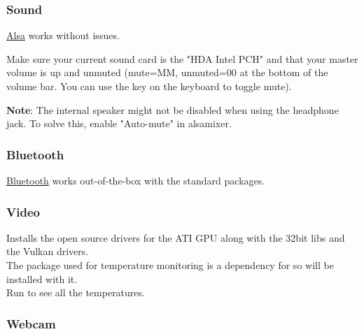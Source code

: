 \subsubsection{Sound}

\href{https://wiki.archlinux.org/index.php/ALSA}{Alsa} works without issues.

\begin{blocksection}
    Make sure your current sound card is the "HDA Intel PCH" and that your master volume is up and unmuted (mute=MM, unmuted=00 at the bottom of the volume bar. You can use the  key on the keyboard to toggle mute).
\end{blocksection}


\textbf{Note}: The internal speaker might not be disabled when using the headphone jack. To solve this, enable "Auto-mute" in alsamixer.

\subsubsection{Bluetooth}

\href{https://wiki.archlinux.org/index.php/Bluetooth}{Bluetooth} works out-of-the-box with the standard packages.


\subsubsection{Video}

\begin{blocksection}
    Installs the open source drivers for the ATI GPU along with the 32bit libs and the Vulkan drivers.\\
    The \href{https://wiki.archlinux.org/index.php/Lm_sensors}{} package used for temperature monitoring is a dependency for  so will be installed with it.\\
    Run  to see all the temperatures.
\end{blocksection}

\subsubsection{Webcam}

